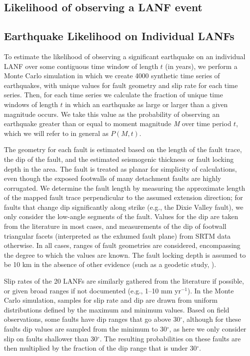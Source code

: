 \documentclass[twocolumn,grl]{AGUTeX}
\begin{document}
\begin{article}
\section{Likelihood of observing a LANF event}
\subsection{Earthquake Likelihood on Individual LANFs}
To estimate the likelihood of observing a significant earthquake on an
individual LANF over some contiguous time window of length $t$ (in
years), we perform a Monte Carlo simulation in which we create 4000
synthetic time series of earthquakes, with unique values for fault
geometry and slip rate for each time series. Then, for each time
series we calculate the fraction of unique time windows of length $t$
in which an earthquake as large or larger than a given magnitude
occurs.  We take this value as the probability of observing an
earthquake greater than or equal to moment magnitude \emph{M} over
time period $t$, which we will refer to in general as $P(M,t)$.

The geometry for each fault is estimated based on the length of the
fault trace, the dip of the fault, and the estimated seismogenic
thickness or fault locking depth in the area.  The fault is treated as
planar for simplicity of calculations, even though the exposed
footwalls of many detachment faults are highly corrugated.  We
determine the fault length by measuring the approximate length of the
mapped fault trace perpendicular to the assumed extension direction;
for faults that change dip significantly along strike (e.g., the Dixie
Valley fault), we only consider the low-angle segments of the fault.
Values for the dip are taken from the literature in most cases, and
measurements of the dip of footwall triangular facets (interpreted as the 
exhumed fault plane) from SRTM data otherwise. In all cases, ranges of fault
geometries are considered, encompassing the degree to which the values are 
known. The fault locking depth is assumed to be 10 km in the absence of other
evidence (such as a geodetic study, \citep[e.g.,][]{hreinsdottir2009altotib}).

Slip rates of the 20 LANFs are similarly gathered from the
literature if possible, or given broad ranges if not documented
(e.g., 1--10 mm yr$^{-1}$).  In the Monte Carlo simulation, samples
for slip rate and dip are drawn from uniform distributions defined
by the maximum and minimum values.  Based on field observations,
some faults have dip ranges that go above 30$^\circ$, although for these faults
dip values are sampled from the minimum to 30$^\circ$, as here we
only consider slip on faults shallower than 30$^\circ$. The resulting
probabilities on these faults are then multiplied by the fraction of
the dip range that is under 30$^\circ$.


\end{article}
\end{document}
